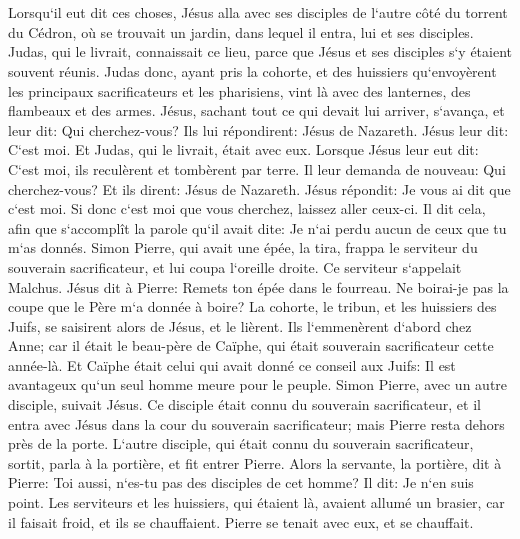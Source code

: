 \chapter{}

\verse Lorsqu`il eut dit ces choses, Jésus alla avec ses disciples de l`autre côté du torrent du Cédron, où se trouvait un jardin, dans lequel il entra, lui et ses disciples. 
\verse Judas, qui le livrait, connaissait ce lieu, parce que Jésus et ses disciples s`y étaient souvent réunis. 
\verse Judas donc, ayant pris la cohorte, et des huissiers qu`envoyèrent les principaux sacrificateurs et les pharisiens, vint là avec des lanternes, des flambeaux et des armes. 
\verse Jésus, sachant tout ce qui devait lui arriver, s`avança, et leur dit: Qui cherchez-vous? 
\verse Ils lui répondirent: Jésus de Nazareth. Jésus leur dit: C`est moi. Et Judas, qui le livrait, était avec eux. 
\verse Lorsque Jésus leur eut dit: C`est moi, ils reculèrent et tombèrent par terre. 
\verse Il leur demanda de nouveau: Qui cherchez-vous? Et ils dirent: Jésus de Nazareth. 
\verse Jésus répondit: Je vous ai dit que c`est moi. Si donc c`est moi que vous cherchez, laissez aller ceux-ci. 
\verse Il dit cela, afin que s`accomplît la parole qu`il avait dite: Je n`ai perdu aucun de ceux que tu m`as donnés. 
\verse Simon Pierre, qui avait une épée, la tira, frappa le serviteur du souverain sacrificateur, et lui coupa l`oreille droite. Ce serviteur s`appelait Malchus. 
\verse Jésus dit à Pierre: Remets ton épée dans le fourreau. Ne boirai-je pas la coupe que le Père m`a donnée à boire? 
\verse La cohorte, le tribun, et les huissiers des Juifs, se saisirent alors de Jésus, et le lièrent. 
\verse Ils l`emmenèrent d`abord chez Anne; car il était le beau-père de Caïphe, qui était souverain sacrificateur cette année-là. 
\verse Et Caïphe était celui qui avait donné ce conseil aux Juifs: Il est avantageux qu`un seul homme meure pour le peuple. 
\verse Simon Pierre, avec un autre disciple, suivait Jésus. Ce disciple était connu du souverain sacrificateur, et il entra avec Jésus dans la cour du souverain sacrificateur; 
\verse mais Pierre resta dehors près de la porte. L`autre disciple, qui était connu du souverain sacrificateur, sortit, parla à la portière, et fit entrer Pierre. 
\verse Alors la servante, la portière, dit à Pierre: Toi aussi, n`es-tu pas des disciples de cet homme? Il dit: Je n`en suis point. 
\verse Les serviteurs et les huissiers, qui étaient là, avaient allumé un brasier, car il faisait froid, et ils se chauffaient. Pierre se tenait avec eux, et se chauffait. 
